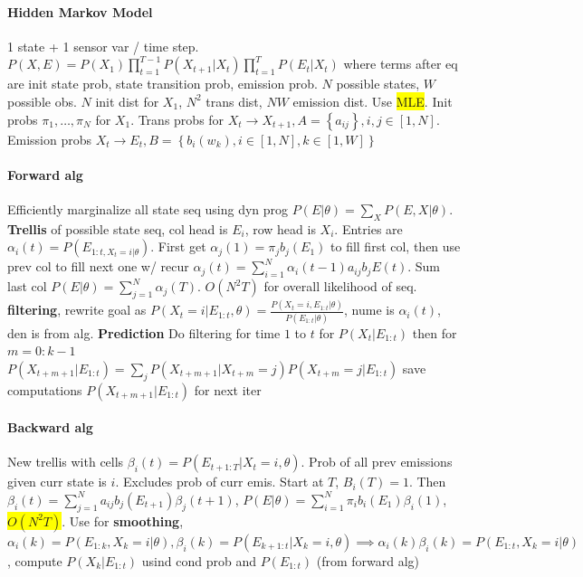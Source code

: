 \paragraph{Hidden Markov Model} 1 state + 1 sensor var / time
step. $P(X,E) = P(X_1)
\prod_{t=1}^{T-1}P(X_{t+1}|X_t)\prod_{t=1}^{T}P(E_t|X_t)$ where terms
after eq
are init state prob, state transition prob, emission prob. $N$
possible states, $W$ possible obs. $N$ init dist for $X_1$, $N^2$
trans dist, $NW$ emission dist. Use \colorbox{yellow}{MLE}. Init probs
$\pi_1, \ldots, \pi_N$ for $X_1$. Trans probs for $X_t \to X_{t+1},
A=\left\{a_{ij}\right\}, i,j\in[1,N]$. Emission probs $X_t \to E_t,
B=\left\{b_i(w_k),i\in [1,N], k\in[1,W]\right\}$
\paragraph{Forward alg} Efficiently marginalize all state seq using
dyn prog $P(E|\theta) = \sum_X P(E,X|\theta)$. \textbf{Trellis} of
possible state seq, col head is $E_i$, row head is $X_i$. Entries are
$\alpha_i(t)=P(E_{1:t,X_t = i | \theta})$. First get $\alpha_j(1)=\pi_j b_j(E_1)$ to fill first
col, then use prev col to fill next one w/ recur $\alpha_j(t)=\sum_{i=1}^N
\alpha_i(t-1)a_{ij}b_jE(t)$. Sum last col $P(E|\theta) =
\sum_{j=1}^N \alpha_j(T)$. $O(N^2T)$ for overall likelihood of seq.
\textbf{filtering}, rewrite goal as $P(X_t = i |
E_{1:t},\theta)=\frac{P(X_t=i,E_{1:t}|\theta)}{P(E_{1:t}|\theta)}$,
nume is $\alpha_i(t)$, den is from alg. \textbf{Prediction} Do
filtering for time $1$ to $t$ for $P(X_t|E_{1:t})$ then for $m=0:k-1$
$P(X_{t+m+1}|E_{1:t})=\sum_j
P(X_{t+m+1}|X_{t+m}=j)P(X_{t+m}=j|E_{1:t})$ save computations
$P(X_{t+m+1}|E_{1:t})$ for next iter
\paragraph{Backward alg} New trellis with cells $\beta_i(t) =
P(E_{t+1:T}|X_t = i, \theta)$. Prob of all prev emissions given curr
state is $i$. Excludes prob of curr emis. Start at $T$, $B_i(T)=1$. Then
$\beta_i(t)=\sum_{j=1}^Na_{ij}b_j(E_{t+1})\beta_j(t+1)$,
$P(E|\theta)=\sum_{i=1}^N \pi_i b_i (E_1)\beta_i (1)$,
\colorbox{yellow}{$O(N^2T)$}. Use for \textbf{smoothing},
$\alpha_i(k)=P(E_{1:k},X_k=i|\theta), \beta_i(k)=P(E_{k+1:t}|X_k = i,
\theta) \implies \alpha_i(k)\beta_i(k)=P(E_{1:t},X_k=i|\theta)$,
compute $P(X_{k}|E_{1:t})$ usind cond prob and $P(E_{1:t})$ (from
forward alg)
